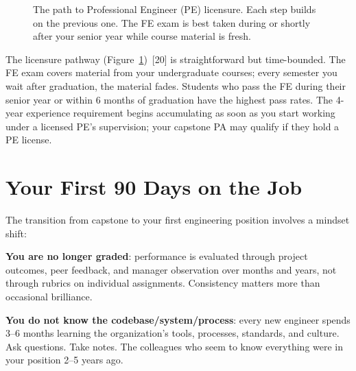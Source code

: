 \begin{figure}[htbp]
\centering
{}
\caption{The path to Professional Engineer (PE) licensure. Each step builds on the previous one. The FE exam is best taken during or shortly after your senior year while course material is fresh.}\label{fig:pe-path}
\end{figure}

The licensure pathway (Figure~\ref{fig:pe-path})~[20] is straightforward but time-bounded. The FE exam covers material from your undergraduate courses; every semester you wait after graduation, the material fades. Students who pass the FE during their senior year or within 6 months of graduation have the highest pass rates. The 4-year experience requirement begins accumulating as soon as you start working under a licensed PE's supervision; your capstone PA may qualify if they hold a PE license.

\section{Your First 90 Days on the Job}
The transition from capstone to your first engineering position involves a mindset shift:

\textbf{You are no longer graded}: performance is evaluated through project outcomes, peer feedback, and manager observation over months and years, not through rubrics on individual assignments. Consistency matters more than occasional brilliance.

\textbf{You do not know the codebase/system/process}: every new engineer spends 3--6 months learning the organization's tools, processes, standards, and culture. Ask questions. Take notes. The colleagues who seem to know everything were in your position 2--5 years ago.


